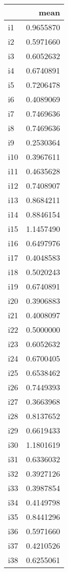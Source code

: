 \documentclass[
]{article}
\begin{document}
\begin{table}
\centering
\begin{tabular}[t]{l|r}
\hline
  & mean\\
\hline
i1 & 0.9655870\\
\hline
i2 & 0.5971660\\
\hline
i3 & 0.6052632\\
\hline
i4 & 0.6740891\\
\hline
i5 & 0.7206478\\
\hline
i6 & 0.4089069\\
\hline
i7 & 0.7469636\\
\hline
i8 & 0.7469636\\
\hline
i9 & 0.2530364\\
\hline
i10 & 0.3967611\\
\hline
i11 & 0.4635628\\
\hline
i12 & 0.7408907\\
\hline
i13 & 0.8684211\\
\hline
i14 & 0.8846154\\
\hline
i15 & 1.1457490\\
\hline
i16 & 0.6497976\\
\hline
i17 & 0.4048583\\
\hline
i18 & 0.5020243\\
\hline
i19 & 0.6740891\\
\hline
i20 & 0.3906883\\
\hline
i21 & 0.4008097\\
\hline
i22 & 0.5000000\\
\hline
i23 & 0.6052632\\
\hline
i24 & 0.6700405\\
\hline
i25 & 0.6538462\\
\hline
i26 & 0.7449393\\
\hline
i27 & 0.3663968\\
\hline
i28 & 0.8137652\\
\hline
i29 & 0.6619433\\
\hline
i30 & 1.1801619\\
\hline
i31 & 0.6336032\\
\hline
i32 & 0.3927126\\
\hline
i33 & 0.3987854\\
\hline
i34 & 0.4149798\\
\hline
i35 & 0.8441296\\
\hline
i36 & 0.5971660\\
\hline
i37 & 0.4210526\\
\hline
i38 & 0.6255061\\
\hline

\end{tabular}
\end{table}
\end{document}
